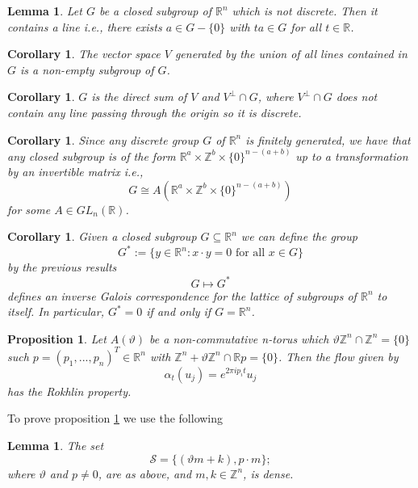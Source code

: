\documentclass[11pt,a4paper,oneside]{amsart}
\newtheorem{lemma}[theorem]{Lemma}
\newtheorem{corollary}[theorem]{Corollary}
\newtheorem{proposition}[theorem]{Proposition}
\begin{document}
\begin{lemma}
Let $G$ be a closed subgroup of $\mathbb{R}^n$ which is not discrete. Then it contains a line i.e., there exists $a\in G-\{0\}$ with $ta\in G$ for all $t\in \mathbb R$.
\end{lemma}

\begin{corollary}
The vector space $V$ generated by the union of all lines contained in $G$ is a non-empty subgroup of $G$.  
\end{corollary}

\begin{corollary}
$G$ is the direct sum of $V$ and $V^\perp\cap G$, where $V^\perp\cap G$ does not contain any line passing through the origin so it is discrete.  
\end{corollary}

\begin{corollary}
Since any discrete group $G$ of $\mathbb R^n$ is finitely generated, we have that any closed subgroup is of the form $\mathbb{R}^a\times \mathbb{Z}^b\times \{0\}^{n-(a+b)}$ up to a transformation by an invertible matrix i.e., \[G\cong A(\mathbb{R}^a\times \mathbb{Z}^b\times \{0\}^{n-(a+b)})\] for some $A\in GL_n(\mathbb{R})$. 
\end{corollary}

\begin{corollary}
Given a closed subgroup $G\subseteq \mathbb{R}^n$ we can define the group \[G^*:=\{y\in \mathbb{R}^n: x\cdot y=0 \text{ for all } x\in G\}\] by the previous results $$G\mapsto G^*$$ defines an inverse Galois correspondence for the lattice of subgroups of $\mathbb R^n$ to itself. In particular, $G^*=0$ if and only if $G=\mathbb{R}^n$.
\end{corollary}

\begin{proposition}\cite[Proposition 2.5]{kishimoto1996rokhlin} 
\label{Roklin property tori} Let $A(\vartheta)$ be a non-commutative n-torus which $\vartheta \mathbb{Z}^n\cap \mathbb{Z}^n=\{0\}$ such $p=(p_1,..., p_n)^T\in \mathbb R^n$ with $\mathbb{Z}^n+\vartheta \mathbb{Z}^n \cap \mathbb{R}p=\{0\}$. Then the flow given by $$\alpha_t(u_j)=e^{2\pi i p_it}u_j$$ has the Rokhlin property. \end{proposition}

To prove proposition \ref{Roklin property tori} we use the following 

\begin{lemma}
The set \[\mathcal S=\{(\vartheta m+k), p\cdot m\};\] where $\vartheta$ and $p\neq 0$, are as above, and $m,k\in \mathbb{Z}^n$, is dense. 

\end{lemma}
\end{document}
